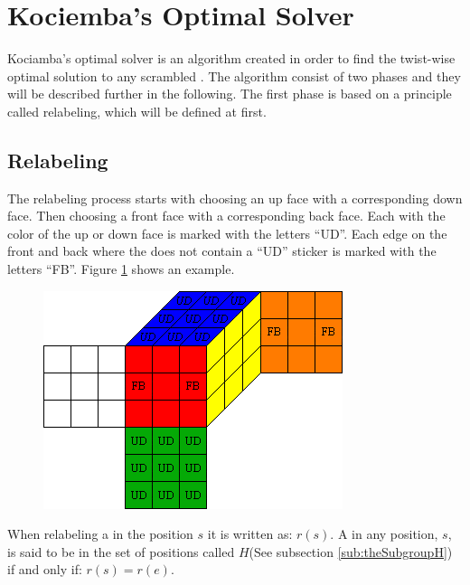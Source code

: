 \section{Kociemba's Optimal Solver}
Kociamba's optimal solver is an algorithm created in order to find the twist-wise optimal solution to any scrambled \rubik{}\cite{kociemba09} \cite{cubelovers92}. The algorithm consist of two phases and they will be described further in the following. The first phase is based on a principle called relabeling, which will be defined at first. 


\subsection{Relabeling}
The relabeling process  starts with choosing an up face with a corresponding down face. Then choosing a front face with a corresponding back face. Each \facelet{} with the color of the up or down face is marked with the letters ``UD''.  Each edge \cpiece{} on the front and back where the \cpiece{} does not contain a ``UD'' sticker is marked with the letters ``FB''. Figure \ref{fig:relabelClean} shows an example.
\begin{figure}[hb]
	\centering
		\includegraphics[scale = 0.8]{input/pics/relabelClean}
	\caption{}
	\label{fig:relabelClean}
\end{figure}
When relabeling a \rubik{} in the position $s$ it is written as: $r(s)$. A \rubik{} in any position, $s$, is said to be in the set of positions called $H$(See subsection \ref{sub:theSubgroupH}) if and only if: $r(s)=r(e)$.

